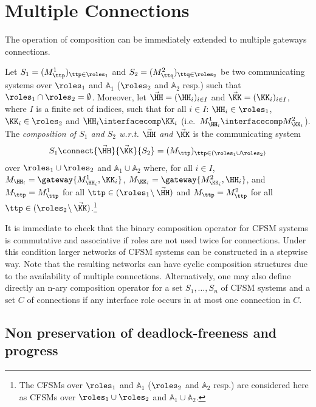 
\section{Multiple Connections}
\label{sec:mulconn}

The operation of composition can be immediately extended to multiple gateways connections.

\begin{definition}
\label{def.multiconn}
Let $S_1 = (M^1_\ttp)_{\ttp\in\roles_1}$ and $S_2 = (M^2_\ttq)_{\ttq\in\roles_2}$ be two communicating systems
over $\roles_1$ and $\mathbb{A}_1$ ($\roles_2$ and $\mathbb{A}_2$ resp.)
such that $\roles_1\cap\roles_2 = \emptyset$.
 Moreover, let $\vec{\HH}=(\HH_i)_{i\in I}$ and  $\vec{\KK}=(\KK_i)_{i\in I}$,
 where $I$ is a finite set of indices, such that for all  $i\in I$: $\HH_i\in\roles_1$, $\KK_i\in\roles_2$  and
 $\HH_i \interfacecomp \KK_i$ (i.e.\ $M^1_{\HH_i} \interfacecomp M^2_{\KK_i}$). \\ 
The \emph{composition of $S_1$ and $S_2$ w.r.t. $\vec{\HH}$ and $\vec{\KK}$} is the communicating system
                        $${S_{1}}\connect{\vec{\HH}}{\vec{\KK}} {S_{2}} = (M_\ttp)_{\ttp\in(\roles_1\cup\roles_2)}$$
over $\roles_1\cup\roles_2$ and $\mathbb{A}_1 \cup \mathbb{A}_2$
where, for all $i\in I$,
 $M_{\HH_i} = \gateway{M^1_{\HH_i}, \KK_i}$, $M_{\KK_i} = \gateway{M^2_{\KK_i}, \HH_i}$, and
$M_\ttp =M^1_\ttp$ for all $\ttp\in(\roles_1\!\setminus \vec{\HH})$ and
$M_\ttp =M^2_\ttp$ for all $\ttp\in(\roles_2\!\setminus \vec{\KK})$.\footnote{The CFSMs over $\roles_1$ and $\mathbb{A}_1$
 ($\roles_2$ and $\mathbb{A}_2$ resp.) are considered here as CFSMs over $\roles_1\cup\roles_2$
 and $\mathbb{A}_1 \cup \mathbb{A}_2$.}
\end{definition}

It is immediate to check that the binary composition operator for CFSM systems is
commutative and associative if roles are not used twice for connections.
Under this condition larger networks of CFSM systems can be constructed in a stepwise way.
Note that the resulting networks can have cyclic composition structures
due to the availability of multiple connections. Alternatively, one may also define
directly an n-ary composition operator
for a set $S_1, \ldots, S_n$ of CFSM systems and a set $C$ of connections
if any interface role occurs in at most one connection in $C$.

\subsection{Non preservation of deadlock-freeness and progress}\label{sec:nonpres}

